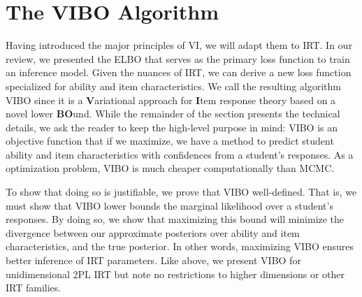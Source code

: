 \section{The VIBO Algorithm}
\label{sec:methods}
Having introduced the major principles of VI, we will adapt them to IRT.
In our review, we presented the ELBO that serves as the primary loss function to train an inference model. Given the nuances of IRT, we can derive a new loss function specialized for ability and item characteristics. We call the resulting algorithm VIBO since it is a \textbf{V}ariational approach for \textbf{I}tem response theory based on a novel lower \textbf{BO}und.
While the remainder of the section presents the technical details, we ask the reader to keep the high-level purpose in mind: VIBO is an objective function that if we maximize, we have a method to predict student ability and item characteristics with confidences from a student's responses. As a optimization problem, VIBO is much cheaper computationally than MCMC.

To show that doing so is justifiable, we prove that VIBO well-defined. That is, we must show that VIBO lower bounds the marginal likelihood over a student's responses. By doing so, we show that maximizing this bound will minimize the divergence between our approximate posteriors over ability and item characteristics, and the true posterior.
In other words, maximizing VIBO ensures better inference of IRT parameters.
Like above, we present VIBO for unidimensional 2PL IRT but note no restrictions to higher dimensions or other IRT families. 

